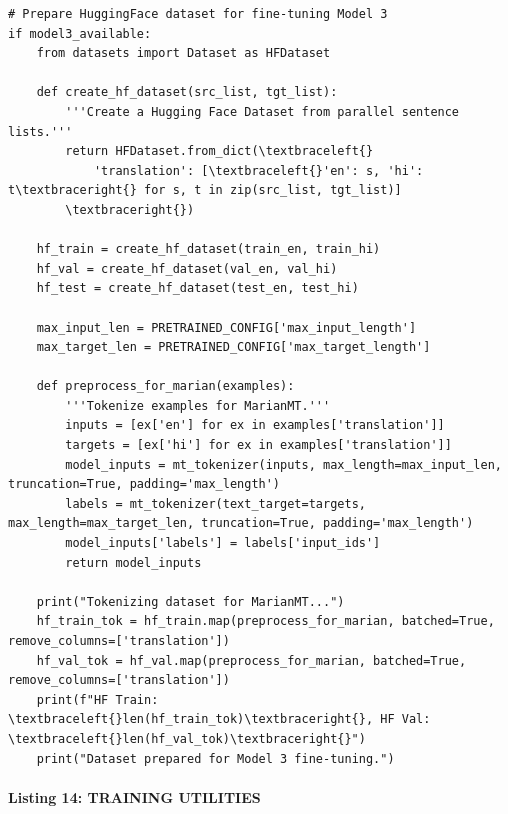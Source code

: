 \documentclass[12pt,a4paper,oneside]{report}
\begin{document}
\begin{Verbatim}[commandchars=\\\{\},breaklines=true,breakanywhere=true,fontsize=\scriptsize,frame=leftline,framesep=2mm,rulecolor=\color{gray}]
# Prepare HuggingFace dataset for fine-tuning Model 3
if model3_available:
    from datasets import Dataset as HFDataset

    def create_hf_dataset(src_list, tgt_list):
        '''Create a Hugging Face Dataset from parallel sentence lists.'''
        return HFDataset.from_dict(\textbraceleft{}
            'translation': [\textbraceleft{}'en': s, 'hi': t\textbraceright{} for s, t in zip(src_list, tgt_list)]
        \textbraceright{})

    hf_train = create_hf_dataset(train_en, train_hi)
    hf_val = create_hf_dataset(val_en, val_hi)
    hf_test = create_hf_dataset(test_en, test_hi)

    max_input_len = PRETRAINED_CONFIG['max_input_length']
    max_target_len = PRETRAINED_CONFIG['max_target_length']

    def preprocess_for_marian(examples):
        '''Tokenize examples for MarianMT.'''
        inputs = [ex['en'] for ex in examples['translation']]
        targets = [ex['hi'] for ex in examples['translation']]
        model_inputs = mt_tokenizer(inputs, max_length=max_input_len, truncation=True, padding='max_length')
        labels = mt_tokenizer(text_target=targets, max_length=max_target_len, truncation=True, padding='max_length')
        model_inputs['labels'] = labels['input_ids']
        return model_inputs

    print("Tokenizing dataset for MarianMT...")
    hf_train_tok = hf_train.map(preprocess_for_marian, batched=True, remove_columns=['translation'])
    hf_val_tok = hf_val.map(preprocess_for_marian, batched=True, remove_columns=['translation'])
    print(f"HF Train: \textbraceleft{}len(hf_train_tok)\textbraceright{}, HF Val: \textbraceleft{}len(hf_val_tok)\textbraceright{}")
    print("Dataset prepared for Model 3 fine-tuning.")
\end{Verbatim}
\paragraph{Listing 14: TRAINING UTILITIES}\mbox{}\\[-1ex]
\end{document}

